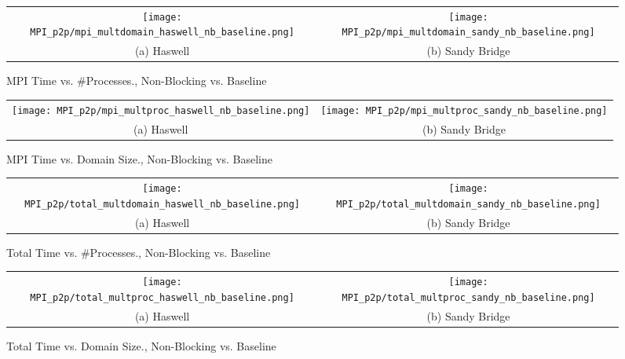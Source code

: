 \begin{enumerate}
		\begin{figure}[h] %
		\hspace*{-0.25\linewidth}\begin{tabular}{cc}
			\texttt{[image: MPI\_p2p/mpi\_multdomain\_haswell\_nb\_baseline.png]} & \texttt{[image: MPI\_p2p/mpi\_multdomain\_sandy\_nb\_baseline.png]} \\
			(a) Haswell &  (b) Sandy Bridge\\[6pt]
		\end{tabular}
		\caption{MPI Time vs. \#Processes., Non-Blocking vs. Baseline}
		\label{fig:mpi_multdomain_nb_baseline}
	\end{figure}
	
		\begin{figure}[h] %
		\hspace*{-0.25\linewidth}\begin{tabular}{cc}
			\texttt{[image: MPI\_p2p/mpi\_multproc\_haswell\_nb\_baseline.png]} & \texttt{[image: MPI\_p2p/mpi\_multproc\_sandy\_nb\_baseline.png]} \\
			(a) Haswell &  (b) Sandy Bridge\\[6pt]
		\end{tabular}
		\caption{MPI Time vs. Domain Size., Non-Blocking vs. Baseline}
		\label{fig:mpi_multproc_nb_baseline}
	\end{figure}
	
			\begin{figure}[h] %
		\hspace*{-0.25\linewidth}\begin{tabular}{cc}
			\texttt{[image: MPI\_p2p/total\_multdomain\_haswell\_nb\_baseline.png]} & \texttt{[image: MPI\_p2p/total\_multdomain\_sandy\_nb\_baseline.png]} \\
			(a) Haswell &  (b) Sandy Bridge\\[6pt]
		\end{tabular}
		\caption{Total Time vs. \#Processes., Non-Blocking vs. Baseline}
		\label{fig:total_multdomain_nb_baseline}
	\end{figure}
	
		\begin{figure}[h] %
		\hspace*{-0.25\linewidth}\begin{tabular}{cc}
			\texttt{[image: MPI\_p2p/total\_multproc\_haswell\_nb\_baseline.png]} & \texttt{[image: MPI\_p2p/total\_multproc\_sandy\_nb\_baseline.png]} \\
			(a) Haswell &  (b) Sandy Bridge\\[6pt]
		\end{tabular}
		\caption{Total Time vs. Domain Size., Non-Blocking vs. Baseline}
		\label{fig:total_multproc_nb_baseline}
	\end{figure}


\end{enumerate}
